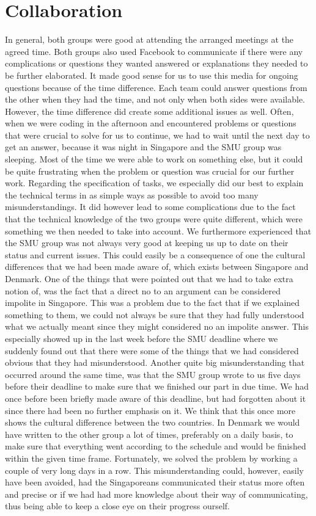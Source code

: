 \section{Collaboration}
In general, both groups were good at attending the arranged meetings at the agreed time.
Both groups also used Facebook to communicate if there were any complications or questions they wanted answered or explanations they needed to be further elaborated. It made good sense for us to use this media for ongoing questions because of the time difference. Each team could answer questions from the other when they had the time, and not only when both sides were available. However, the time difference did create some additional issues as well. Often, when we were coding in the afternoon and encountered problems or questions that were crucial to solve for us to continue, we had to wait until the next day to get an answer, because it was night in Singapore and the SMU group was sleeping. Most of the time we were able to work on something else, but it could be quite frustrating when the problem or question was crucial for our further work.
Regarding the specification of tasks, we especially did our best to explain the technical terms in as simple ways as possible to avoid too many misunderstandings. It did however lead to some complications due to the fact that the technical knowledge of the two groups were quite different, which were something we then needed to take into account.
We furthermore experienced that the SMU group was not always very good at keeping us up to date on their status and current issues. This could easily be a consequence of one the cultural differences that we had been made aware of, which exists between Singapore and Denmark. One of the things that were pointed out that we had to take extra notion of, was the fact that a direct no to an argument can be considered impolite in Singapore. This was a problem due to the fact that if we explained something to them, we could not always be sure that they had fully understood what we actually meant since they might considered no an impolite answer. This especially showed up in the last week before the SMU deadline where we suddenly found out that there were some of the things that we had considered obvious that they had misunderstood. Another quite big misunderstanding that occurred around the same time, was that the SMU group wrote to us five days before their deadline to make sure that we finished our part in due time. We had once before been briefly made aware of this deadline, but had forgotten about it since there had been no further emphasis on it. We think that this once more shows the cultural difference between the two countries. In Denmark we would have written to the other group a lot of times, preferably on a daily basis, to make sure that everything went according to the schedule and would be finished within the given time frame. Fortunately, we solved the problem by working a couple of very long days in a row. This misunderstanding could, however, easily have been avoided, had the Singaporeans communicated their status more often and precise or if we had had more knowledge about their way of communicating, thus being able to keep a close eye on their progress ourself. 
